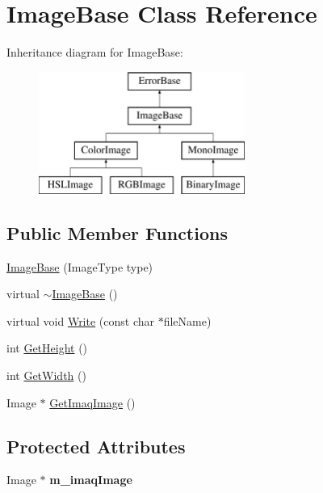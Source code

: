 \hypertarget{classImageBase}{
\section{ImageBase Class Reference}
\label{classImageBase}
}
Inheritance diagram for ImageBase:\begin{figure}[H]
\begin{center}
\leavevmode
\includegraphics[height=4.000000cm]{classImageBase}
\end{center}
\end{figure}
\subsection*{Public Member Functions}
\begin{DoxyCompactItemize}
\item 
\hyperlink{classImageBase_ae7b60d1f993176af583793777fc5e77c}{ImageBase} (ImageType type)
\item 
virtual \hyperlink{classImageBase_ab0ff98f0be1117315fd3a347baef849f}{$\sim$ImageBase} ()
\item 
virtual void \hyperlink{classImageBase_a46b36b2c97e4f8c3646d15f83be6b269}{Write} (const char $\ast$fileName)
\item 
int \hyperlink{classImageBase_a9e7e9ccf53a83a7ffe4058871a7f1780}{GetHeight} ()
\item 
int \hyperlink{classImageBase_ab064981a8450f1241630b205e8586b60}{GetWidth} ()
\item 
Image $\ast$ \hyperlink{classImageBase_a938fe24b9e96b1cb95e3d93f9ac9f492}{GetImaqImage} ()
\end{DoxyCompactItemize}
\subsection*{Protected Attributes}
\begin{DoxyCompactItemize}
\item 
\hypertarget{classImageBase_acd73b184af200acbccc7dddd6ff985f1}{
Image $\ast$ {\bfseries m\_\-imaqImage}}
\label{classImageBase_acd73b184af200acbccc7dddd6ff985f1}

\end{DoxyCompactItemize}


